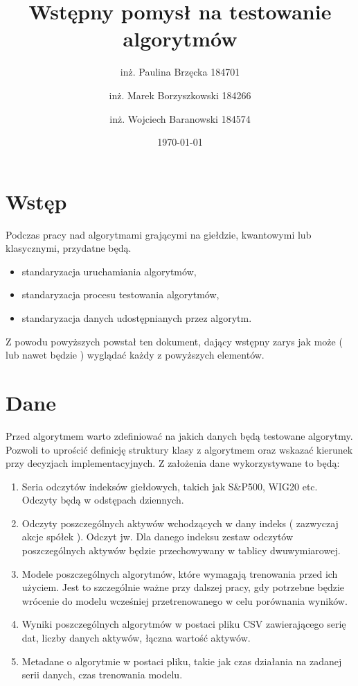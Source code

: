 \documentclass[polish,envcountsect,10pt]{article}
\title{Wstępny pomysł na testowanie algorytmów}
\author{inż. Paulina Brzęcka 184701 \and inż. Marek Borzyszkowski 184266 \and inż. Wojciech Baranowski 184574}
\date{\today}
\begin{document}
\maketitle
\tableofcontents
\newpage

\section{Wstęp}

Podczas pracy nad algorytmami grającymi na giełdzie, kwantowymi lub klasycznymi, przydatne będą.
\begin{itemize}
    \item standaryzacja uruchamiania algorytmów,
    \item standaryzacja procesu testowania algorytmów,
    \item standaryzacja danych udostępnianych przez algorytm.
\end{itemize}

Z powodu powyższych powstał ten dokument, dający wstępny zarys jak może ( lub nawet będzie ) wyglądać każdy z powyższych elementów.

\section{Dane}
Przed algorytmem warto zdefiniować na jakich danych będą testowane algorytmy.
Pozwoli to uprościć definicję struktury klasy z algorytmem oraz wskazać kierunek przy decyzjach implementacyjnych.
Z założenia dane wykorzystywane to będą:
\begin{enumerate}
    \item Seria odczytów indeksów giełdowych, takich jak S\&P500, WIG20 etc. Odczyty będą w odstępach dziennych.
    \item Odczyty poszczególnych aktywów wchodzących w dany indeks ( zazwyczaj akcje spółek ). Odczyt jw. Dla danego indeksu zestaw odczytów poszczególnych aktywów będzie przechowywany w tablicy dwuwymiarowej.
    \item Modele poszczególnych algorytmów, które wymagają trenowania przed ich użyciem. Jest to szczególnie ważne przy dalszej pracy, gdy potrzebne będzie wrócenie do modelu wcześniej przetrenowanego w celu porównania wyników.
    \item Wyniki poszczególnych algorytmów w postaci pliku CSV zawierającego serię dat, liczby danych aktywów, łączna wartość aktywów.
    \item Metadane o algorytmie w postaci pliku, takie jak czas działania na zadanej serii danych, czas trenowania modelu.   
\end{enumerate}
\end{document}
